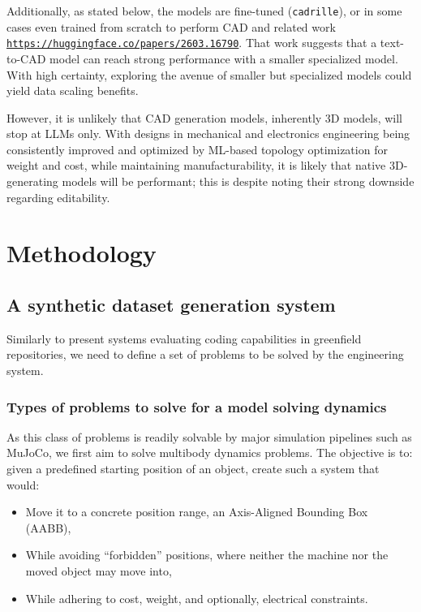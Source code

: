 \documentclass[conference]{IEEEtran}
\begin{document}
Additionally, as stated below, the models are fine-tuned (\texttt{cadrille}), or in some cases even trained from scratch to perform CAD and related work \href{https://huggingface.co/papers/2603.16790}{\nolinkurl{https://huggingface.co/papers/2603.16790}}. That work suggests that a text-to-CAD model can reach strong performance with a smaller specialized model. With high certainty, exploring the avenue of smaller but specialized models could yield data scaling benefits.

However, it is unlikely that CAD generation models, inherently 3D models, will stop at LLMs only. With designs in mechanical and electronics engineering being consistently improved and optimized by ML-based topology optimization \cite{ref11} for weight and cost, while maintaining manufacturability, it is likely that native 3D-generating models will be performant; this is despite noting their strong downside regarding editability.

\section{Methodology}

\subsection{A synthetic dataset generation system}
Similarly to present systems evaluating coding capabilities in greenfield repositories, we need to define a set of problems to be solved by the engineering system.

\subsubsection{Types of problems to solve for a model solving dynamics}
As this class of problems is readily solvable by major simulation pipelines such as MuJoCo, we first aim to solve multibody dynamics problems. The objective is to: given a predefined starting position of an object, create such a system that would:

\begin{itemize}
    \item Move it to a concrete position range, an Axis-Aligned Bounding Box (AABB),
    \item While avoiding ``forbidden'' positions, where neither the machine nor the moved object may move into,
    \item While adhering to cost, weight, and optionally, electrical constraints.
\end{itemize}
\end{document}
